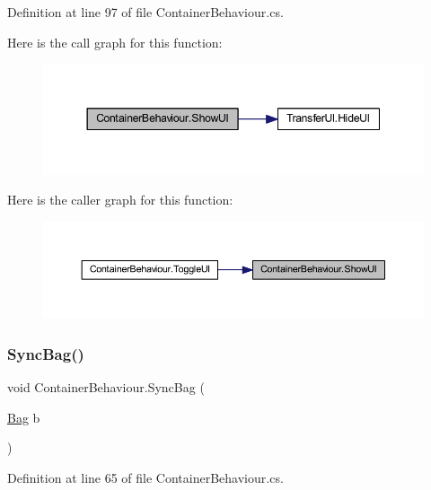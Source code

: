 Definition at line 97 of file Container\+Behaviour.\+cs.

Here is the call graph for this function\+:
\nopagebreak
\begin{figure}[H]
\begin{center}
\leavevmode
\includegraphics[width=344pt]{class_container_behaviour_ae4733d72cba5780939349f6d9beeba8f_cgraph}
\end{center}
\end{figure}
Here is the caller graph for this function\+:
\nopagebreak
\begin{figure}[H]
\begin{center}
\leavevmode
\includegraphics[width=350pt]{class_container_behaviour_ae4733d72cba5780939349f6d9beeba8f_icgraph}
\end{center}
\end{figure}
\mbox{\label{class_container_behaviour_aea3c37f67bc244516f307f2c59a27b8f}} 
\subsubsection{\texorpdfstring{SyncBag()}{SyncBag()}}
{\footnotesize\ttfamily void Container\+Behaviour.\+Sync\+Bag (\begin{DoxyParamCaption}\item[{\mbox{\hyperlink{class_bag}{Bag}}}]{b }\end{DoxyParamCaption})}



Definition at line 65 of file Container\+Behaviour.\+cs.

